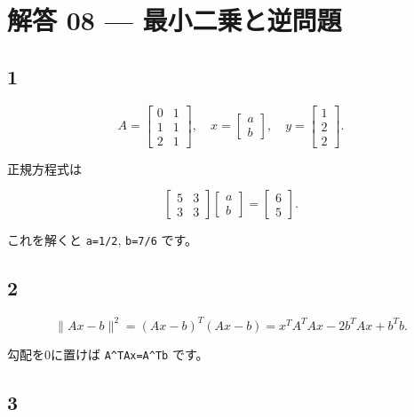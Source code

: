 \documentclass[
  11pt,
  a4paper,
]{ltjsarticle}
\author{}
\date{}
\begin{document}
\hypertarget{ux89e3ux7b54-08-ux6700ux5c0fux4e8cux4e57ux3068ux9006ux554fux984c}{%
\section{解答 08 ---
最小二乗と逆問題}\label{ux89e3ux7b54-08-ux6700ux5c0fux4e8cux4e57ux3068ux9006ux554fux984c}}

\hypertarget{section}{%
\subsection{1}\label{section}}

\[
A=\begin{bmatrix}0&1\\1&1\\2&1\end{bmatrix},\quad
x=\begin{bmatrix}a\\b\end{bmatrix},\quad
y=\begin{bmatrix}1\\2\\2\end{bmatrix}.
\]

正規方程式は

\[
\begin{bmatrix}5&3\\3&3\end{bmatrix}
\begin{bmatrix}a\\b\end{bmatrix}
=\begin{bmatrix}6\\5\end{bmatrix}.
\]

これを解くと \texttt{a=1/2}, \texttt{b=7/6} です。

\hypertarget{section-1}{%
\subsection{2}\label{section-1}}

\[
\|Ax-b\|^2=(Ax-b)^T(Ax-b)
=x^TA^TAx-2b^TAx+b^Tb.
\]

勾配を0に置けば \texttt{A\^{}TAx=A\^{}Tb} です。

\hypertarget{section-2}{%
\subsection{3}\label{section-2}}
\end{document}

